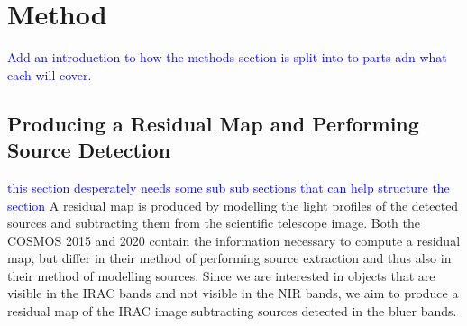 \section{Method}
\textcolor{blue}{Add an introduction to how the methods section is split into to parts adn what each will cover}.

\subsection{Producing a Residual Map and Performing Source Detection}
\textcolor{blue}{this section desperately needs some sub sub sections that can help structure the section}
A residual map is produced by modelling the light profiles of the detected sources and subtracting them from the scientific telescope image. Both the COSMOS 2015 and 2020 contain the information necessary to compute a residual map, but differ in their method of performing source extraction and thus also in their method of modelling sources. Since we are interested in objects that are visible in the IRAC bands and not visible in the NIR bands, we aim to produce a residual map of the IRAC image subtracting sources detected in the bluer bands. \\

